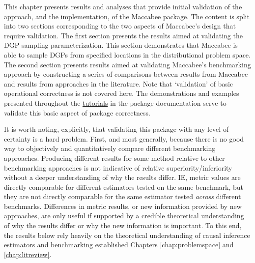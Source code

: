 \documentclass[../main.tex]{subfiles}
\begin{document}

\vspace{\baselineskip}

This chapter presents results and analyses that provide initial validation of the approach, and the implementation, of the Maccabee package. The content is split into two sections corresponding to the two aspects of Maccabee's design that require validation. The first section presents the results aimed at validating the DGP sampling parameterization. This section demonstrates that Maccabee is able to sample DGPs from specified locations in the distributional problem space. The second section presents results aimed at validating Maccabee's benchmarking approach by constructing a series of comparisons between results from Maccabee and results from approaches in the literature. Note that `validation' of basic operational correctness is not covered here. The demonstrations and examples presented throughout the \href{\RTDurl/usage.html}{tutorials} in the package documentation serve to validate this basic aspect of package correctness.

\vspace{\baselineskip}

It is worth noting, explicitly, that validating this package with any level of certainty is a hard problem. First, and most generally, because there is no good way to objectively and quantitatively compare different benchmarking approaches. Producing different results for some method relative to other benchmarking approaches is not indicative of relative superiority/inferiority without a deeper understanding of why the results differ. IE, metric values are directly comparable for different estimators tested on the same benchmark, but they are not directly comparable for the same estimator tested \textit{across} different benchmarks. Differences in metric results, or new information provided by new approaches, are only useful if supported by a credible theoretical understanding of why the results differ or why the new information is important. To this end, the results below rely heavily on the theoretical understanding of causal inference estimators and benchmarking established Chapters \ref{chap:problemspace} and \ref{chap:litreview}.

\vspace{\baselineskip}
\end{document}
